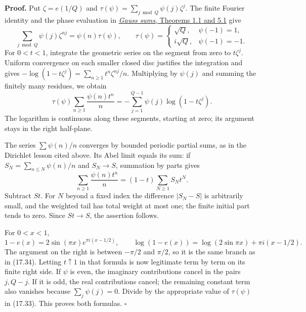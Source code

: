 \documentclass[
  11pt,
  a4paper,
]{article}
\begin{document}
\textbf{Proof.} Put \(\zeta=e(1/Q)\) and
\(\tau(\psi)=\sum_{j\bmod Q}\psi(j)\zeta^j\). The finite Fourier
identity and the phase evaluation in
\href{https://kokunoyumeto.github.io/open-math-courses-public/courses/NT-DIRL/NT-DIRL-03.html}{\emph{Gauss sums}, Theorems 1.1 and
5.1} give \[
 \sum_{j\bmod Q}\psi(j)\zeta^{nj}
       =\psi(n)\tau(\psi),\qquad
 \tau(\psi)=
 \begin{cases}
 \sqrt Q,&\psi(-1)=1,\\
 i\sqrt Q,&\psi(-1)=-1.
 \end{cases}
 \tag{17.33}
\] For \(0<t<1\), integrate the geometric series on the segment from
zero to \(t\zeta^j\). Uniform convergence on each smaller closed disc
justifies the integration and gives
\(-\log(1-t\zeta^j)=\sum_{n\ge1}t^n\zeta^{nj}/n\). Multiplying by
\(\psi(j)\) and summing the finitely many residues, we obtain \[
 \tau(\psi)\sum_{n\ge1}\frac{\psi(n)t^n}{n}
     =-\sum_{j=1}^{Q-1}\psi(j)\log(1-t\zeta^j).
 \tag{17.34}
\] The logarithm is continuous along these segments, starting at zero;
its argument stays in the right half-plane.

The series \(\sum\psi(n)/n\) converges by bounded periodic partial sums,
as in the Dirichlet lesson cited above. Its Abel limit equals its sum:
if \(S_N=\sum_{n\le N}\psi(n)/n\) and \(S_N\to S\), summation by parts
gives \[
 \sum_{n\ge1}\frac{\psi(n)t^n}{n}
       =(1-t)\sum_{N\ge1}S_Nt^N.
\] Subtract \(St\). For \(N\) beyond a fixed index the difference
\(|S_N-S|\) is arbitrarily small, and the weighted tail has total weight
at most one; the finite initial part tends to zero. Since \(St\to S\),
the assertion follows.

For \(0<x<1\), \[
 1-e(x)=2\sin(\pi x)e^{\pi i(x-1/2)},
 \qquad
 \log(1-e(x))=\log(2\sin\pi x)+\pi i(x-1/2).
 \tag{17.35}
\] The argument on the right is between \(-\pi/2\) and \(\pi/2\), so it
is the same branch as in (17.34). Letting \(t\uparrow1\) in that formula
is now legitimate term by term on its finite right side. If \(\psi\) is
even, the imaginary contributions cancel in the pairs \(j,Q-j\). If it
is odd, the real contributions cancel; the remaining constant term also
vanishes because \(\sum_j\psi(j)=0\). Divide by the appropriate value of
\(\tau(\psi)\) in (17.33). This proves both formulas. \(\square\)
\end{document}
